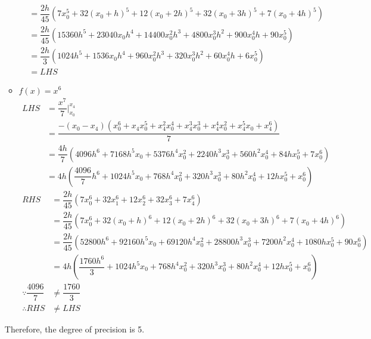 \documentclass{article}
\begin{document}
\begin{enumerate}
\begin{itemize}
\begin{align*}
&=\dfrac{2h}{45}(7x_0^5+32(x_0+h)^5+12(x_0+2h)^5+32(x_0+3h)^5+7(x_0+4h)^5)\\
&=\dfrac{2h}{45}(15360 h^5 + 23040 x_0h^4 + 14400 x_0^2h^3 + 4800 x_0^3h^2 + 900 x_0^4h + 90x_0^5)\\
&=\dfrac{2h}{3}(1024 h^5 + 1536 x_0h^4 + 960 x_0^2h^3 + 320 x_0^3h^2 + 60 x_0^4h + 6x_0^5)\\&=LHS
\end{align*}
\item $f(x) = x^6$
\begin{align*}
LHS &=\dfrac{x^7}{7}|_{x_0}^{x_4}\\
&=\dfrac{-(x_0 - x_4) (x_0^6 + x_4 x_0^5 + x_4^2 x_0^4 + x_4^3 x_0^3 + x_4^4 x_0^2 + x_4^5 x_0 + x_4^6)}{7}\\
&=\dfrac{4h}{7}(4096 h^6 + 7168 h^5 x_0 + 5376 h^4 x_0^2 + 2240 h^3 x_0^3 + 560 h^2 x_0^4 + 84 h x_0^5 + 7 x_0^6)\\
&=4h\left( \dfrac{4096}{7} h^6 + 1024 h^5 x_0 + 768 h^4 x_0^2 + 320 h^3 x_0^3 + 80 h^2 x_0^4 + 12 h x_0^5 + x_0^6\right)
\end{align*}
\begin{align*}
RHS &=\dfrac{2h}{45}(7x_0^6+32x_1^6+12x_2^6+32x_3^6+7x_4^6)\\
&=\dfrac{2h}{45}(7x_0^6+32(x_0+h)^6+12(x_0+2h)^6+32(x_0+3h)^6+7(x_0+4h)^6)\\
&=\dfrac{2h}{45}(52800 h^6 + 92160 h^5 x_0 + 69120 h^4 x_0^2 + 28800 h^3 x_0^3 + 7200 h^2 x_0^4 + 1080 h x_0^5 + 90 x_0^6)\\
&=4h\left(\dfrac{1760 h^6}{3} + 1024 h^5 x_0 + 768 h^4 x_0^2 + 320 h^3 x_0^3 + 80 h^2 x_0^4 + 12 h x_0^5 + x_0^6\right)\\
\because \dfrac{4096}{7}&\neq \dfrac{1760}{3}\\
\therefore RHS&\neq LHS
\end{align*}
\end{itemize}
Therefore, the degree of precision is 5.

 \end{enumerate}
\end{document}
